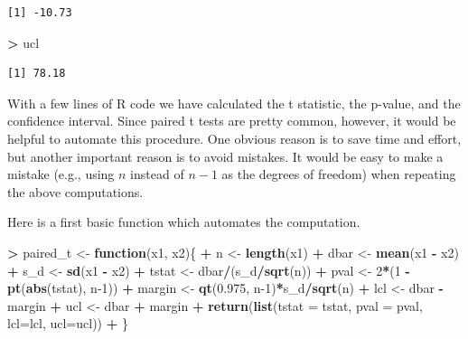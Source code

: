 \documentclass[
]{krantz}
\makeatletter
\newenvironment{Shaded}{\begin{snugshade}}{\end{snugshade}}
\newcommand{\ControlFlowTok}[1]{\textcolor[rgb]{0.27,0.27,0.27}{\textbf{#1}}}
\newcommand{\DataTypeTok}[1]{\textcolor[rgb]{0.27,0.27,0.27}{#1}}
\newcommand{\DecValTok}[1]{\textcolor[rgb]{0.06,0.06,0.06}{#1}}
\newcommand{\FloatTok}[1]{\textcolor[rgb]{0.06,0.06,0.06}{#1}}
\newcommand{\KeywordTok}[1]{\textcolor[rgb]{0.27,0.27,0.27}{\textbf{#1}}}
\newcommand{\NormalTok}[1]{#1}
\newcommand{\OperatorTok}[1]{\textcolor[rgb]{0.43,0.43,0.43}{\textbf{#1}}}
\newcommand{\StringTok}[1]{\textcolor[rgb]{0.5,0.5,0.5}{#1}}
\newenvironment{kframe}{%
\medskip{}
\setlength{\fboxsep}{.8em}
 \def\at@end@of@kframe{}%
 \ifinner\ifhmode%
  \def\at@end@of@kframe{\end{minipage}}%
  \begin{minipage}{\columnwidth}%
 \fi\fi%
 \def\FrameCommand##1{\hskip\@totalleftmargin \hskip-\fboxsep
 \colorbox{shadecolor}{##1}\hskip-\fboxsep
     \hskip-\linewidth \hskip-\@totalleftmargin \hskip\columnwidth}%
 \MakeFramed {\advance\hsize-\width
   \@totalleftmargin\z@ \linewidth\hsize
   \@setminipage}}%
 {\par\unskip\endMakeFramed%
 \at@end@of@kframe}
\renewenvironment{Shaded}{\begin{kframe}}{\end{kframe}}
\makeatother
\begin{document}
\begin{verbatim}
[1] -10.73
\end{verbatim}

\begin{Shaded}
\begin{Highlighting}[]
\OperatorTok{\textgreater{}}\StringTok{ }\NormalTok{ucl}
\end{Highlighting}
\end{Shaded}

\begin{verbatim}
[1] 78.18
\end{verbatim}

With a few lines of R code we have calculated the t statistic, the p-value, and the confidence interval. Since paired t tests are pretty common, however, it would be helpful to automate this procedure. One obvious reason is to save time and effort, but another important reason is to avoid mistakes. It would be easy to make a mistake (e.g., using \(n\) instead of \(n-1\) as the degrees of freedom) when repeating the above computations.

Here is a first basic function which automates the computation.

\begin{Shaded}
\begin{Highlighting}[]
\OperatorTok{\textgreater{}}\StringTok{ }\NormalTok{paired\_t \textless{}{-}}\StringTok{ }\ControlFlowTok{function}\NormalTok{(x1, x2)\{}
\OperatorTok{+}\StringTok{     }\NormalTok{n \textless{}{-}}\StringTok{ }\KeywordTok{length}\NormalTok{(x1)}
\OperatorTok{+}\StringTok{     }\NormalTok{dbar \textless{}{-}}\StringTok{ }\KeywordTok{mean}\NormalTok{(x1 }\OperatorTok{{-}}\StringTok{ }\NormalTok{x2)}
\OperatorTok{+}\StringTok{     }\NormalTok{s\_d \textless{}{-}}\StringTok{ }\KeywordTok{sd}\NormalTok{(x1 }\OperatorTok{{-}}\StringTok{ }\NormalTok{x2)}
\OperatorTok{+}\StringTok{     }\NormalTok{tstat \textless{}{-}}\StringTok{ }\NormalTok{dbar}\OperatorTok{/}\NormalTok{(s\_d}\OperatorTok{/}\KeywordTok{sqrt}\NormalTok{(n))}
\OperatorTok{+}\StringTok{     }\NormalTok{pval \textless{}{-}}\StringTok{ }\DecValTok{2}\OperatorTok{*}\NormalTok{(}\DecValTok{1} \OperatorTok{{-}}\StringTok{ }\KeywordTok{pt}\NormalTok{(}\KeywordTok{abs}\NormalTok{(tstat), n}\DecValTok{{-}1}\NormalTok{))}
\OperatorTok{+}\StringTok{     }\NormalTok{margin \textless{}{-}}\StringTok{ }\KeywordTok{qt}\NormalTok{(}\FloatTok{0.975}\NormalTok{, n}\DecValTok{{-}1}\NormalTok{)}\OperatorTok{*}\NormalTok{s\_d}\OperatorTok{/}\KeywordTok{sqrt}\NormalTok{(n)}
\OperatorTok{+}\StringTok{     }\NormalTok{lcl \textless{}{-}}\StringTok{ }\NormalTok{dbar }\OperatorTok{{-}}\StringTok{ }\NormalTok{margin}
\OperatorTok{+}\StringTok{     }\NormalTok{ucl \textless{}{-}}\StringTok{ }\NormalTok{dbar }\OperatorTok{+}\StringTok{ }\NormalTok{margin}
\OperatorTok{+}\StringTok{     }\KeywordTok{return}\NormalTok{(}\KeywordTok{list}\NormalTok{(}\DataTypeTok{tstat =}\NormalTok{ tstat, }\DataTypeTok{pval =}\NormalTok{ pval, }\DataTypeTok{lcl=}\NormalTok{lcl, }\DataTypeTok{ucl=}\NormalTok{ucl))}
\OperatorTok{+}\StringTok{ }\NormalTok{\}}
\end{Highlighting}
\end{Shaded}
\end{document}
